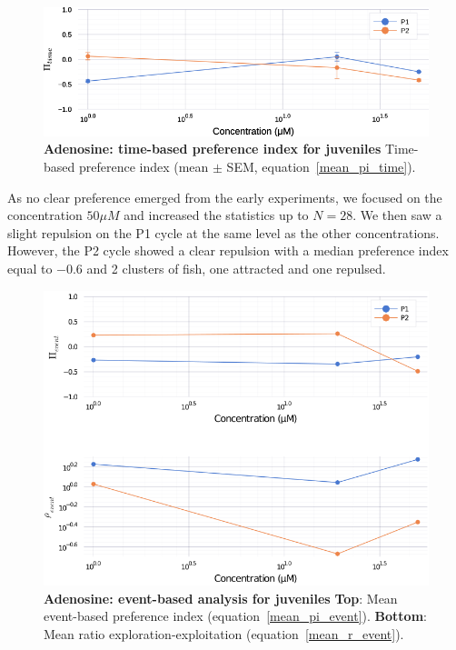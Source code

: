     \begin{figure}[h!]
      \centering
      \includegraphics[width=1\textwidth]{part_2/assets/adenosine.png}
      \caption{\textbf{Adenosine: time-based preference index for juveniles} Time-based preference index (mean $\pm$ SEM, equation~\ref{mean_pi_time}).}
      \label{adenosine}
    \end{figure}

  As no clear preference emerged from the early experiments, we focused on the concentration $50 \mu M$ and increased the statistics up to $N=28$. We then saw a slight repulsion on the P1 cycle at the same level as the other concentrations. However, the P2 cycle showed a clear repulsion with a median preference index equal to $-0.6$ and 2 clusters of fish, one attracted and one repulsed.

    \begin{figure}[h!]
      \centering
      \includegraphics[width=1\textwidth]{part_2/assets/adenosine_event.png}
      \caption{\textbf{Adenosine: event-based analysis for juveniles} \textbf{Top}: Mean event-based preference index (equation~\ref{mean_pi_event}). \textbf{Bottom}: Mean ratio exploration-exploitation (equation~\ref{mean_r_event}).}
      \label{adenosine_event}
    \end{figure}

